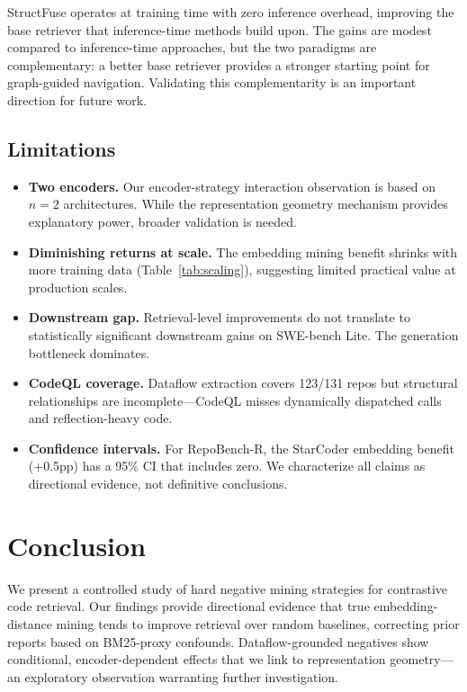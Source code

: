 \documentclass[11pt,a4paper]{article}
\begin{document}
StructFuse operates at training time with zero inference overhead, improving the base retriever that inference-time methods build upon. The gains are modest compared to inference-time approaches, but the two paradigms are complementary: a better base retriever provides a stronger starting point for graph-guided navigation. Validating this complementarity is an important direction for future work.

\subsection{Limitations}

\begin{itemize}
\item \textbf{Two encoders.} Our encoder-strategy interaction observation is based on $n = 2$ architectures. While the representation geometry mechanism provides explanatory power, broader validation is needed.
\item \textbf{Diminishing returns at scale.} The embedding mining benefit shrinks with more training data (Table~\ref{tab:scaling}), suggesting limited practical value at production scales.
\item \textbf{Downstream gap.} Retrieval-level improvements do not translate to statistically significant downstream gains on SWE-bench Lite. The generation bottleneck dominates.
\item \textbf{CodeQL coverage.} Dataflow extraction covers 123/131 repos but structural relationships are incomplete---CodeQL misses dynamically dispatched calls and reflection-heavy code.
\item \textbf{Confidence intervals.} For RepoBench-R, the StarCoder embedding benefit (+0.5pp) has a 95\% CI that includes zero. We characterize all claims as directional evidence, not definitive conclusions.
\end{itemize}

\section{Conclusion}
\label{sec:conclusion}

We present a controlled study of hard negative mining strategies for contrastive code retrieval. Our findings provide directional evidence that true embedding-distance mining tends to improve retrieval over random baselines, correcting prior reports based on BM25-proxy confounds. Dataflow-grounded negatives show conditional, encoder-dependent effects that we link to representation geometry---an exploratory observation warranting further investigation.
\end{document}
